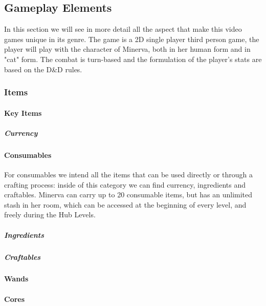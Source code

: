 \subsection{Gameplay Elements}

In this section we will see in more detail all the aspect that make this video games unique in its genre. The game is a 2D single player third person game, the player will play with the character of Minerva, both in her human form and in "cat" form. The combat is turn-based and the formulation of the player's stats are based on the D\&D rules.



\subsubsection{Items}

\paragraph{Key Items}


\subparagraph{Currency}


\pagebreak
\paragraph{Consumables}
For consumables we intend all the items that can be used directly or through a crafting process: inside of this category we can find currency, ingredients and craftables. Minerva can carry up to 20 consumable items, but has an unlimited stash in her room, which can be accessed at the beginning of every level, and freely during the Hub Levels. \\

\subparagraph{Ingredients}


\subparagraph{Craftables}


\paragraph{Wands}


\paragraph{Cores}



